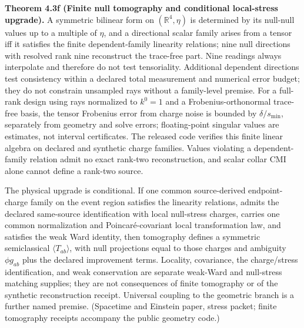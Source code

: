 \textbf{Theorem 4.3f (Finite null tomography and conditional local-stress upgrade).} A symmetric bilinear form on \((\mathbb R^4,\eta)\) is determined by its null-null values up to a multiple of \(\eta\), and a directional scalar family arises from a tensor iff it satisfies the finite dependent-family linearity relations; nine null directions with resolved rank nine reconstruct the trace-free part. Nine readings always interpolate and therefore do not test tensoriality. Additional dependent directions test consistency within a declared total measurement and numerical error budget; they do not constrain unsampled rays without a family-level premise. For a full-rank design using rays normalized to \(k^0=1\) and a Frobenius-orthonormal trace-free basis, the tensor Frobenius error from charge noise is bounded by \(\delta/s_{\min}\), separately from geometry and solve errors; floating-point singular values are estimates, not interval certificates. The released code verifies this finite linear algebra on declared and synthetic charge families. Values violating a dependent-family relation admit no exact rank-two reconstruction, and scalar collar CMI alone cannot define a rank-two source.

The physical upgrade is conditional. If one common source-derived endpoint-charge family on the event region satisfies the linearity relations, admits the declared same-source identification with local null-stress charges, carries one common normalization and Poincar\'e-covariant local transformation law, and satisfies the weak Ward identity, then tomography defines a symmetric semiclassical \(\langle T_{ab}\rangle\), with null projections equal to those charges and ambiguity \(\phi g_{ab}\) plus the declared improvement terms. Locality, covariance, the charge/stress identification, and weak conservation are separate weak-Ward and null-stress matching supplies; they are not consequences of finite tomography or of the synthetic reconstruction receipt. Universal coupling to the geometric branch is a further named premise. (Spacetime and Einstein paper, stress packet; finite tomography receipts accompany the public geometry code.)

